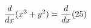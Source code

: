 \documentclass[preview]{standalone}
\begin{document}
\begin{align*}
{d \over dx}(x^2 + y^2) = {d \over dx}(25)
\end{align*}
\end{document}
